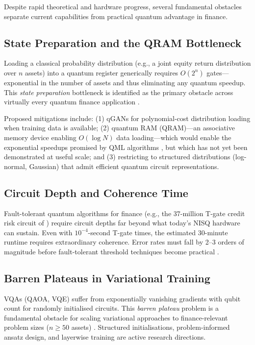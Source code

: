\documentclass[12pt,a4paper]{article}
\begin{document}
Despite rapid theoretical and hardware progress, several fundamental obstacles separate current capabilities from practical quantum advantage in finance.

\subsection{State Preparation and the QRAM Bottleneck}

Loading a classical probability distribution (e.g., a joint equity return distribution over $n$ assets) into a quantum register generically requires $O(2^n)$ gates---exponential in the number of assets and thus eliminating any quantum speedup. This \emph{state preparation} bottleneck is identified as the primary obstacle across virtually every quantum finance application \citep{stamatopoulos_option_2020, herman_quantum_2023, matsakos_quantum_2024, blanchet_connecting_2025}.

Proposed mitigations include: (1) qGANs for polynomial-cost distribution loading when training data is available; (2) quantum RAM (QRAM)---an associative memory device enabling $O(\log N)$ data loading---which would enable the exponential speedups promised by QML algorithms \citep{biamonte_quantum_2017}, but which has not yet been demonstrated at useful scale; and (3) restricting to structured distributions (log-normal, Gaussian) that admit efficient quantum circuit representations.

\subsection{Circuit Depth and Coherence Time}

Fault-tolerant quantum algorithms for finance (e.g., the 37-million T-gate credit risk circuit of \citet{egger_quantum_2020}) require circuit depths far beyond what today's NISQ hardware can sustain. Even with $10^{-4}$-second T-gate times, the estimated 30-minute runtime requires extraordinary coherence. Error rates must fall by 2--3 orders of magnitude before fault-tolerant threshold techniques become practical \citep{preskill_quantum_2018, blanchet_connecting_2025}.

\subsection{Barren Plateaus in Variational Training}

VQAs (QAOA, VQE) suffer from exponentially vanishing gradients with qubit count for randomly initialised circuits. This \emph{barren plateau} problem is a fundamental obstacle for scaling variational approaches to finance-relevant problem sizes ($n \geq 50$ assets) \citep{herman_quantum_2023, gong_quantum_2026-1}. Structured initialisations, problem-informed ansatz design, and layerwise training are active research directions.
\end{document}
